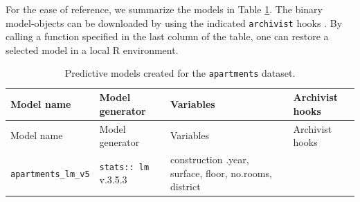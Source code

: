 \documentclass[]{krantz}
\begin{document}
For the ease of reference, we summarize the models in Table \ref{tab:archivistHooksOfModelsApartments}. The binary model-objects can be downloaded by using the indicated \texttt{archivist} hooks \citep{archivist}. By calling a function specified in the last column of the table, one can restore a selected model in a local R environment.

\begin{longtable}[]{@{}llll@{}}
\caption{\label{tab:archivistHooksOfModelsApartments} Predictive models created for the \texttt{apartments} dataset.}\tabularnewline
\toprule
\begin{minipage}[b]{0.21\columnwidth}\raggedright
Model name\strut
\end{minipage} & \begin{minipage}[b]{0.25\columnwidth}\raggedright
Model generator\strut
\end{minipage} & \begin{minipage}[b]{0.18\columnwidth}\raggedright
Variables\strut
\end{minipage} & \begin{minipage}[b]{0.25\columnwidth}\raggedright
Archivist hooks\strut
\end{minipage}\tabularnewline
\midrule
\endfirsthead
\toprule
\begin{minipage}[b]{0.21\columnwidth}\raggedright
Model name\strut
\end{minipage} & \begin{minipage}[b]{0.25\columnwidth}\raggedright
Model generator\strut
\end{minipage} & \begin{minipage}[b]{0.18\columnwidth}\raggedright
Variables\strut
\end{minipage} & \begin{minipage}[b]{0.25\columnwidth}\raggedright
Archivist hooks\strut
\end{minipage}\tabularnewline
\midrule
\endhead
\begin{minipage}[t]{0.21\columnwidth}\raggedright
\texttt{apartments\_lm\_v5}\strut
\end{minipage} & \begin{minipage}[t]{0.25\columnwidth}\raggedright
\texttt{stats::\ lm} v.3.5.3\strut
\end{minipage} & \begin{minipage}[t]{0.18\columnwidth}\raggedright
construction .year, surface, floor, no.rooms, district\strut
\end{minipage} & \begin{minipage}[t]{0.25\columnwidth}\raggedright

\end{minipage}
\end{longtable}
\end{document}
